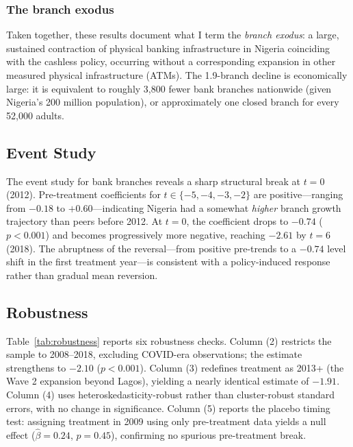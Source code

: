 \documentclass[12pt]{article}
\begin{document}
\subsubsection*{The branch exodus} Taken together, these results document what I term the \textit{branch exodus}: a large, sustained contraction of physical banking infrastructure in Nigeria coinciding with the cashless policy, occurring without a corresponding expansion in other measured physical infrastructure (ATMs). The 1.9-branch decline is economically large: it is equivalent to roughly 3,800 fewer bank branches nationwide (given Nigeria's 200 million population), or approximately one closed branch for every 52,000 adults.

\subsection{Event Study}

The event study for bank branches reveals a sharp structural break at $t = 0$ (2012). Pre-treatment coefficients for $t \in \{-5, -4, -3, -2\}$ are positive---ranging from $-0.18$ to $+0.60$---indicating Nigeria had a somewhat \textit{higher} branch growth trajectory than peers before 2012. At $t = 0$, the coefficient drops to $-0.74$ ($p < 0.001$) and becomes progressively more negative, reaching $-2.61$ by $t = 6$ (2018). The abruptness of the reversal---from positive pre-trends to a $-0.74$ level shift in the first treatment year---is consistent with a policy-induced response rather than gradual mean reversion.

\subsection{Robustness}



Table~\ref{tab:robustness} reports six robustness checks. Column (2) restricts the sample to 2008--2018, excluding COVID-era observations; the estimate strengthens to $-2.10$ ($p < 0.001$). Column (3) redefines treatment as 2013+ (the Wave 2 expansion beyond Lagos), yielding a nearly identical estimate of $-1.91$. Column (4) uses heteroskedasticity-robust rather than cluster-robust standard errors, with no change in significance. Column (5) reports the placebo timing test: assigning treatment in 2009 using only pre-treatment data yields a null effect ($\hat{\beta} = 0.24$, $p = 0.45$), confirming no spurious pre-treatment break.
\end{document}
